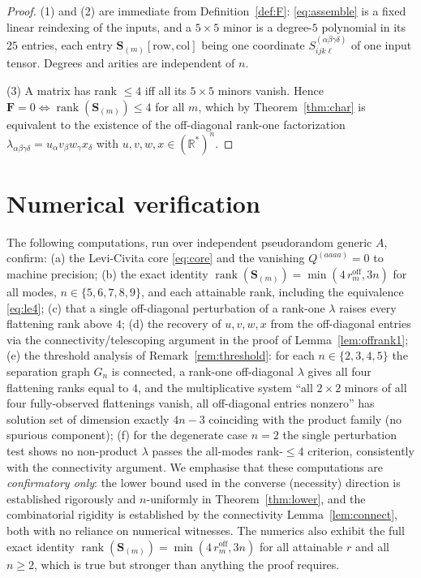 \begin{proof}
(1) and (2) are immediate from Definition~\ref{def:F}: \eqref{eq:assemble} is a fixed
linear reindexing of the inputs, and a $5\times5$ minor is a degree-$5$ polynomial in
its $25$ entries, each entry $\mathbf S_{(m)}[\text{row},\text{col}]$ being one
coordinate $S^{(\alpha\beta\gamma\delta)}_{ijk\ell}$ of one input tensor. Degrees and
arities are independent of $n$.

(3) A matrix has rank $\le4$ iff all its $5\times5$ minors vanish. Hence $\mathbf F=0
\iff\operatorname{rank}(\mathbf S_{(m)})\le4$ for all $m$, which by
Theorem~\ref{thm:char} is equivalent to the existence of the off-diagonal rank-one
factorization $\lambda_{\alpha\beta\gamma\delta}=u_\alpha v_\beta w_\gamma x_\delta$ with
$u,v,w,x\in(\mathbb R^*)^n$.
\end{proof}

\appendix
\section{Numerical verification}

The following computations, run over independent pseudorandom generic $A$, confirm:
(a) the Levi-Civita core \eqref{eq:core} and the vanishing $Q^{(aaaa)}=0$ to machine
precision;
(b) the exact identity $\operatorname{rank}(\mathbf S_{(m)})=\min(4\,r_m^{\mathrm{off}},3n)$
for all modes, $n\in\{5,6,7,8,9\}$, and each attainable rank, including the equivalence
\eqref{eq:le4};
(c) that a single off-diagonal perturbation of a rank-one $\lambda$ raises every
flattening rank above $4$;
(d) the recovery of $u,v,w,x$ from the off-diagonal entries via the
connectivity/telescoping argument in the proof of Lemma~\ref{lem:offrank1};
(e) the threshold analysis of Remark~\ref{rem:threshold}: for each $n\in\{2,3,4,5\}$ the
separation graph $G_n$ is connected, a rank-one off-diagonal $\lambda$ gives all four
flattening ranks equal to $4$, and the multiplicative system ``all $2\times2$ minors of all
four fully-observed flattenings vanish, all off-diagonal entries nonzero'' has solution set
of dimension exactly $4n-3$ coinciding with the product family (no spurious component);
(f) for the degenerate case $n=2$ the single perturbation test shows no non-product
$\lambda$ passes the all-modes rank-$\le4$ criterion, consistently with the connectivity
argument.
We emphasise that these computations are \emph{confirmatory only}: the lower bound used in
the converse (necessity) direction is established rigorously and $n$-uniformly in
Theorem~\ref{thm:lower}, and the combinatorial rigidity is established by the connectivity
Lemma~\ref{lem:connect}, both with no reliance on numerical witnesses. The numerics also
exhibit the full exact identity $\operatorname{rank}(\mathbf S_{(m)})=\min(4\,r_m^{\mathrm{off}},3n)$
for all attainable $r$ and all $n\ge2$, which is true but stronger than anything the proof
requires.


